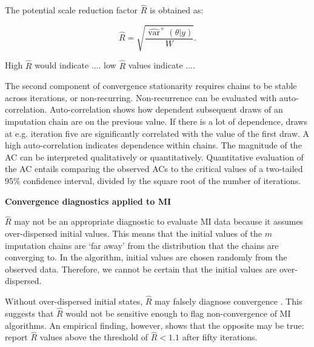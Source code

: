 \documentclass[article]{jss}
\begin{document}
The potential scale reduction factor $\widehat{R}$ is obtained as:

\begin{equation*}
\widehat{R}=\sqrt{\frac{\widehat{\operatorname{var}}^{+}(\theta | y)}{W}}.
\end{equation*}

High $\widehat{R}$ would indicate .... low $\widehat{R}$ values indicate ....

The second component of convergence stationarity requires chains to be stable across iterations, or non-recurring. Non-recurrence can be evaluated with auto-correlation. Auto-correlation shows how dependent subsequent draws of an imputation chain are on the previous value. If there is a lot of dependence, draws at e.g. iteration five are significantly correlated with the value of the first draw. A high auto-correlation indicates dependence within chains. The magnitude of the AC can be interpreted qualitatively or quantitatively. Quantitative evaluation of the AC entails comparing the observed ACs to the critical values of a two-tailed 95\% confidence interval, divided by the square root of the number of iterations. %

\textbf{Convergence diagnostics applied to MI}


$\widehat{R}$ may not be an appropriate diagnostic to evaluate MI data because it assumes over-dispersed initial values. This means that the initial values of the $m$ imputation chains are `far away' from the distribution that the chains are converging to. In the  algorithm, initial values are chosen randomly from the observed data. Therefore, we cannot be certain that the initial values are over-dispersed. %



Without over-dispersed initial states, $\widehat{R}$ may falsely diagnose convergence \citep{broo98}. %
This suggests that $\widehat{R}$ would not be sensitive enough to flag non-convergence of MI algorithms. An empirical finding, however, shows that the opposite may be true: \cite{lace07} report $\widehat{R}$ values above the threshold of $\widehat{R} < 1.1$ after fifty iterations. %
\end{document}

